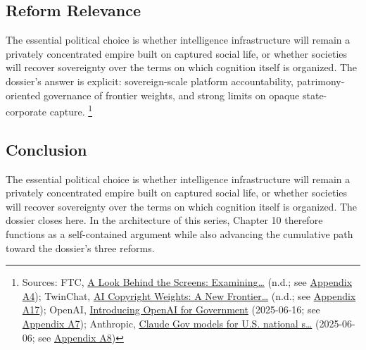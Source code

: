 \documentclass[
  american,
  11pt,
  letterpaper,
]{article}
\begin{document}
\subsection{Reform Relevance}\label{reform-relevance-10}

The essential political choice is whether intelligence infrastructure
will remain a privately concentrated empire built on captured social
life, or whether societies will recover sovereignty over the terms on
which cognition itself is organized. The dossier's answer is explicit:
sovereign-scale platform accountability, patrimony-oriented governance
of frontier weights, and strong limits on opaque state-corporate
capture. \footnote{Sources: FTC,
  \href{https://www.ftc.gov/reports/look-behind-screens-examining-data-practices-social-media-video-streaming-services}{A
  Look Behind the Screens: Examining\ldots{}} (n.d.; see
  \hyperref[ch-10-appendix-a4-a-look-behind-the-screens-examining-the-data-practices-of-social-media-and-video-streaming-services]{Appendix
  A4}); TwinChat,
  \href{https://medium.com/twinchat/ai-copyright-weights-a-new-frontier-in-intellectual-property-law-d8ee1b6c55ee}{AI
  Copyright Weights: A New Frontier\ldots{}} (n.d.; see
  \hyperref[ch-10-appendix-a17-ai-copyright-weights-a-new-frontier-in-intellectual-property-law]{Appendix
  A17}); OpenAI,
  \href{https://openai.com/global-affairs/introducing-openai-for-government/}{Introducing
  OpenAI for Government} (2025-06-16; see
  \hyperref[ch-10-appendix-a7-introducing-openai-for-government]{Appendix
  A7}); Anthropic,
  \href{https://www.anthropic.com/news/claude-gov-models-for-u-s-national-security-customers}{Claude
  Gov models for U.S. national s\ldots{}} (2025-06-06; see
  \hyperref[ch-10-appendix-a8-claude-gov-models-for-u-s-national-security-customers]{Appendix
  A8})}

\subsection{Conclusion}\label{conclusion-10}

The essential political choice is whether intelligence infrastructure
will remain a privately concentrated empire built on captured social
life, or whether societies will recover sovereignty over the terms on
which cognition itself is organized. The dossier closes here. In the
architecture of this series, Chapter 10 therefore functions as a
self-contained argument while also advancing the cumulative path toward
the dossier's three reforms.
\end{document}
